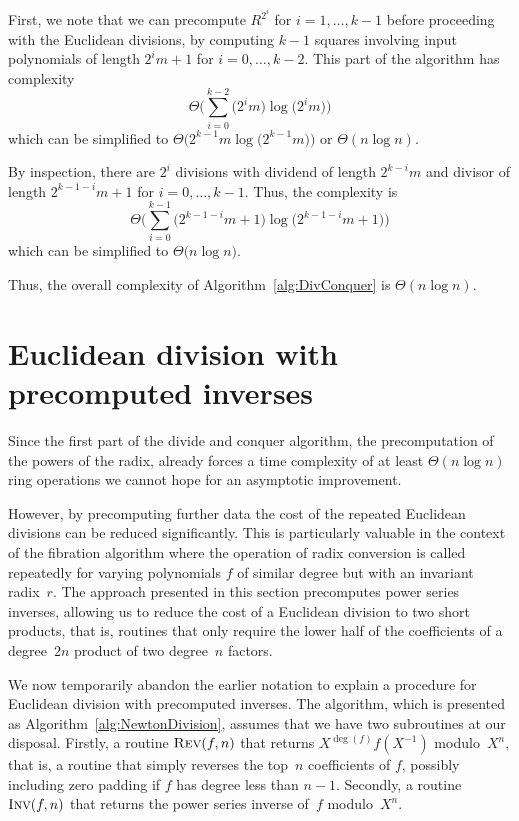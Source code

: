 First, we note that we can precompute $R^{2^i}$ for $i = 1, \dotsc, k-1$ 
before proceeding with the Euclidean divisions, by computing $k-1$ squares 
involving input polynomials of length $2^{i} m + 1$ for 
$i = 0, \dotsc, k-2$.  This part of the algorithm has complexity 
\begin{equation*}
\Theta \biggl( \sum_{i=0}^{k-2} \bigl(2^{i} m\bigr) \log \bigl(2^{i} m\bigr) \biggr)
\end{equation*}
which can be simplified to 
$\Theta\bigl(2^{k-1} m \log \bigl(2^{k-1} m\bigr) \bigr)$ 
or $\Theta(n \log n)$.

By inspection, there are $2^i$ divisions with dividend of length 
$2^{k-i} m$ and divisor of length $2^{k-1-i} m + 1$
for $i = 0, \dotsc, k-1$.  Thus, the complexity is 
\begin{equation*}
\Theta \biggl( \sum_{i=0}^{k-1} \bigl(2^{k-1-i} m + 1\bigr) 
    \log \bigl(2^{k-1-i} m + 1\bigr) \biggr)
\end{equation*}
which can be simplified to $\Theta \bigl( n \log n \bigr)$.

Thus, the overall complexity of Algorithm~\ref{alg:DivConquer} is 
$\Theta(n \log n)$.


\section{Euclidean division with precomputed inverses}

Since the first part of the divide and conquer algorithm, the 
precomputation of the powers of the radix, already forces a 
time complexity of at least $\Theta (n \log n)$ ring operations 
we cannot hope for an asymptotic improvement.

However, by precomputing further data the cost of the repeated 
Euclidean divisions can be reduced significantly.  This is 
particularly valuable in the context of the fibration algorithm 
where the operation of radix conversion is called repeatedly 
for varying polynomials $f$ of similar degree but with an invariant 
radix~$r$.  The approach presented in this section precomputes 
power series inverses, allowing us to reduce the cost of a 
Euclidean division to two short products, that is, routines
that only require the lower half of the coefficients of a degree~$2n$ 
product of two degree~$n$ factors.

We now temporarily abandon the earlier notation to explain 
a procedure for Euclidean division with precomputed inverses. 
The algorithm, which is presented as Algorithm~\ref{alg:NewtonDivision}, 
assumes that we have two subroutines at our disposal.  Firstly, 
a routine $\Call{Rev}{f,n}$ that returns $X^{\deg(f)} f(X^{-1})$ 
modulo~$X^n$, that is, a routine that simply reverses the top~$n$ 
coefficients of $f$, possibly including zero padding if $f$ has degree 
less than $n - 1$.  Secondly, a routine $\Call{Inv}{f,n}$ that returns 
the power series inverse of~$f$ modulo~$X^n$.


